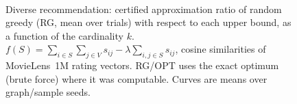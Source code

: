 \begin{figure}[t]
\centering
\setlength{\rgplotwidth}{0.245\textwidth}
\\[1pt]
\hfill
\hfill
\hfill

\caption{Diverse recommendation: certified approximation ratio of random greedy (RG, mean over trials) with respect to each upper bound, as a function of the cardinality $k$. $f(S)=\sum_{i\in S}\sum_{j\in V}s_{ij}-\lambda\sum_{i,j\in S}s_{ij}$, cosine similarities of MovieLens~1M rating vectors. RG/OPT uses the exact optimum (brute force) where it was computable. Curves are means over graph/sample seeds.}
\label{fig:rg-diverse_rec-wide}
\end{figure}
